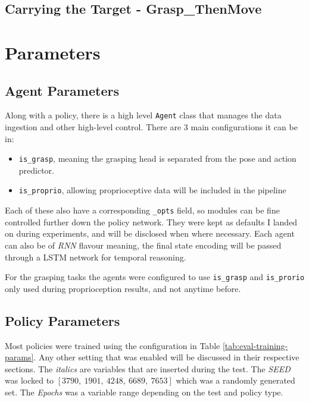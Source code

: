 \subsection{Carrying the Target - \textbf{Grasp\_ThenMove}}

\section{Parameters}

\subsection{Agent Parameters}
Along with a policy, there is a high level \verb|Agent| class that manages the data ingestion and other high-level control. There are 3 main configurations it can be in:
\begin{itemize}
  \item \verb|is_grasp|, meaning the grasping head is separated from the pose and action predictor.
  \item \verb|is_proprio|, allowing proprioceptive data will be included in the pipeline
\end{itemize}
Each of these also have a corresponding \verb|_opts| field, so modules can be fine controlled further down the policy network. They were kept as defaults I landed on during experiments, and will be disclosed when where necessary. Each agent can also be of \emph{RNN} flavour meaning, the final state encoding will be passed through a LSTM network for temporal reasoning.

For the grasping tasks the agents were configured to use \verb|is_grasp| and \verb|is_prorio| only used during proprioception results, and not anytime before.

\subsection{Policy Parameters}
Most policies were trained using the configuration in Table \ref{tab:eval-training-params}. Any other setting that was enabled will be discussed in their respective sections. The \emph{italics} are variables that are inserted during  the test. The \emph{SEED} was locked to \( \left[ 3790, ~1901, ~4248, ~6689, ~7653 \right] \) which was a randomly generated set. The \emph{Epochs} was a variable range depending on the test and policy type.

